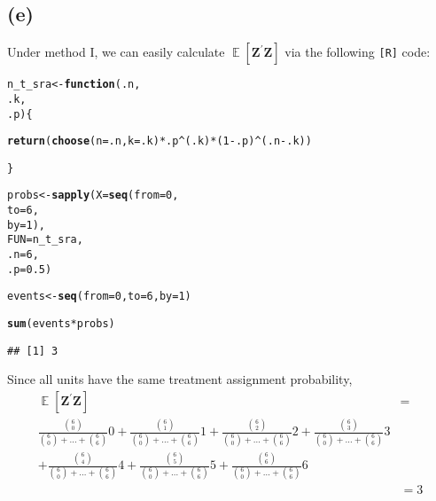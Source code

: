 \documentclass[11pt]{article}\usepackage[]{graphicx}\usepackage[]{color}
\makeatletter
\newcommand{\hlnum}[1]{\textcolor[rgb]{0.686,0.059,0.569}{#1}}%
\newcommand{\hlopt}[1]{\textcolor[rgb]{0,0,0}{#1}}%
\newcommand{\hlstd}[1]{\textcolor[rgb]{0.345,0.345,0.345}{#1}}%
\newcommand{\hlkwa}[1]{\textcolor[rgb]{0.161,0.373,0.58}{\textbf{#1}}}%
\newcommand{\hlkwb}[1]{\textcolor[rgb]{0.69,0.353,0.396}{#1}}%
\newcommand{\hlkwc}[1]{\textcolor[rgb]{0.333,0.667,0.333}{#1}}%
\newcommand{\hlkwd}[1]{\textcolor[rgb]{0.737,0.353,0.396}{\textbf{#1}}}%
\newenvironment{kframe}{%
 \def\at@end@of@kframe{}%
 \ifinner\ifhmode%
  \def\at@end@of@kframe{\end{minipage}}%
  \begin{minipage}{\columnwidth}%
 \fi\fi%
 \def\FrameCommand##1{\hskip\@totalleftmargin \hskip-\fboxsep
 \colorbox{shadecolor}{##1}\hskip-\fboxsep
     \hskip-\linewidth \hskip-\@totalleftmargin \hskip\columnwidth}%
 \MakeFramed {\advance\hsize-\width
   \@totalleftmargin\z@ \linewidth\hsize
   \@setminipage}}%
 {\par\unskip\endMakeFramed%
 \at@end@of@kframe}
\newenvironment{knitrout}{}{} %
\theoremstyle{newstyle}
\DeclareMathOperator{\E}{\mathbb{E}}
\makeatother
\begin{document}
\subsection{(e)}

Under method I, we can easily calculate $\E\left[\mathbf{Z}^{\prime}\mathbf{Z}\right]$ via the following \texttt{[R]} code:

\begin{knitrout}
\color{fgcolor}\begin{kframe}
\begin{alltt}
\hlstd{n_t_sra} \hlkwb{<-} \hlkwa{function}\hlstd{(}\hlkwc{.n}\hlstd{,}
                    \hlkwc{.k}\hlstd{,}
                    \hlkwc{.p}\hlstd{) \{}

  \hlkwd{return}\hlstd{(}\hlkwd{choose}\hlstd{(}\hlkwc{n} \hlstd{= .n,} \hlkwc{k} \hlstd{= .k)} \hlopt{*} \hlstd{.p}\hlopt{^}\hlstd{(.k)}\hlopt{*}\hlstd{(}\hlnum{1} \hlopt{-} \hlstd{.p)}\hlopt{^}\hlstd{(.n} \hlopt{-} \hlstd{.k))}

  \hlstd{\}}

\hlstd{probs} \hlkwb{<-} \hlkwd{sapply}\hlstd{(}\hlkwc{X} \hlstd{=} \hlkwd{seq}\hlstd{(}\hlkwc{from} \hlstd{=} \hlnum{0}\hlstd{,}
                        \hlkwc{to} \hlstd{=} \hlnum{6}\hlstd{,}
                        \hlkwc{by} \hlstd{=} \hlnum{1}\hlstd{),}
                \hlkwc{FUN} \hlstd{= n_t_sra,}
                \hlkwc{.n} \hlstd{=} \hlnum{6}\hlstd{,}
                \hlkwc{.p} \hlstd{=} \hlnum{0.5}\hlstd{)}


\hlstd{events} \hlkwb{<-} \hlkwd{seq}\hlstd{(}\hlkwc{from} \hlstd{=} \hlnum{0} \hlstd{,} \hlkwc{to} \hlstd{=} \hlnum{6}\hlstd{,} \hlkwc{by} \hlstd{=} \hlnum{1}\hlstd{)}

\hlkwd{sum}\hlstd{(events} \hlopt{*} \hlstd{probs)}
\end{alltt}
\begin{verbatim}
## [1] 3
\end{verbatim}
\end{kframe}
\end{knitrout}

Since all units have the same treatment assignment probability,
\begin{align*}
\E\left[\mathbf{Z}^{\prime}\mathbf{Z}\right] & = \\ 
\frac{{6 \choose 0}}{{6 \choose 0} + \dots + {6 \choose 6}}0 + \frac{{6 \choose 1}}{{6 \choose 0} + \dots + {6 \choose 6}}1 + \frac{{6 \choose 2}}{{6 \choose 0} + \dots + {6 \choose 6}}2 + \frac{{6 \choose 3}}{{6 \choose 0} + \dots + {6 \choose 6}}3 \\
+ \frac{{6 \choose 4}}{{6 \choose 0} + \dots + {6 \choose 6}}4 + \frac{{6 \choose 5}}{{6 \choose 0} + \dots + {6 \choose 6}}5  + \frac{{6 \choose 6}}{{6 \choose 0} + \dots + {6 \choose 6}}6 \\
& = 3
\end{align*}
\end{document}
